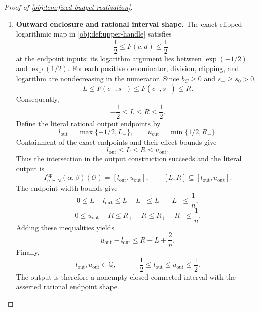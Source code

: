 \begin{proof}[Proof of \cref{obj:lem:fixed-budget-realization}]
\begin{enumerate}
\item \textbf{Outward enclosure and rational interval shape.}
The exact clipped logarithmic map in \cref{obj:def:upper-handle} satisfies
\[
-\frac12\le F(c,d)\le\frac12
\]
at the endpoint inputs: its logarithm argument lies between
\(\exp(-1/2)\) and \(\exp(1/2)\). For each positive denominator, division, clipping, and logarithm are nondecreasing in the numerator. Since \(b_C\ge0\) and \(s_-\ge s_0>0\),
\[
L
\le F(c_-,s_-)
\le F(c_+,s_-)
\le R.
\]
Consequently,
\[
-\frac12\le L\le R\le\frac12.
\]
Define the literal rational output endpoints by
\[
l_{\mathrm{out}}=\max\{-1/2,L_-\},
\qquad
u_{\mathrm{out}}=\min\{1/2,R_+\}.
\]
Containment of the exact endpoints and their effect bounds give
\[
l_{\mathrm{out}}\le L\le R\le u_{\mathrm{out}}.
\]
Thus the intersection in the output construction succeeds and the literal output is
\[
I^{\mathrm{up}}_{n,\mathsf E,\mathsf N}(\alpha,\beta)(\mathcal O)
=[l_{\mathrm{out}},u_{\mathrm{out}}],
\qquad
[L,R]\subseteq[l_{\mathrm{out}},u_{\mathrm{out}}].
\]
The endpoint-width bounds give
\[
0\le L-l_{\mathrm{out}}
\le L-L_-\le L_+-L_-\le\frac1n,
\]
\[
0\le u_{\mathrm{out}}-R
\le R_+-R\le R_+-R_-\le\frac1n.
\]
Adding these inequalities yields
\[
u_{\mathrm{out}}-l_{\mathrm{out}}
\le R-L+\frac2n.
\]
Finally,
\[
l_{\mathrm{out}},u_{\mathrm{out}}\in\mathbb Q,
\qquad
-\frac12\le l_{\mathrm{out}}\le u_{\mathrm{out}}\le\frac12.
\]
The output is therefore a nonempty closed connected interval with the asserted rational endpoint shape.


\end{enumerate}
\end{proof}
